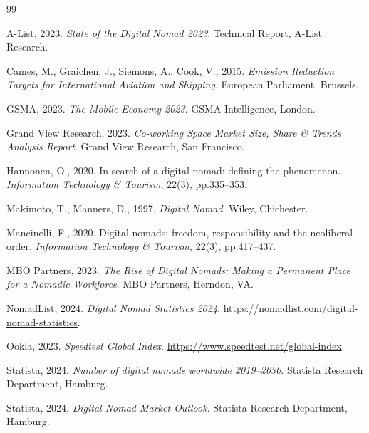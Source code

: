 \documentclass[12pt,a4paper]{article}
\begin{document}
\clearpage

\begin{thebibliography}{99}

A-List, 2023.
\newblock \emph{State of the Digital Nomad 2023}.
\newblock Technical Report, A-List Research.

Cames, M., Graichen, J., Siemons, A., Cook, V., 2015.
\newblock \emph{Emission Reduction Targets for International Aviation and
  Shipping}.
\newblock European Parliament, Brussels.

GSMA, 2023.
\newblock \emph{The Mobile Economy 2023}.
\newblock GSMA Intelligence, London.

Grand View Research, 2023.
\newblock \emph{Co-working Space Market Size, Share \& Trends Analysis Report}.
\newblock Grand View Research, San Francisco.

Hannonen, O., 2020.
\newblock In search of a digital nomad: defining the phenomenon.
\newblock \emph{Information Technology \& Tourism}, 22(3), pp.335--353.

Makimoto, T., Manners, D., 1997.
\newblock \emph{Digital Nomad}.
\newblock Wiley, Chichester.

Mancinelli, F., 2020.
\newblock Digital nomads: freedom, responsibility and the neoliberal order.
\newblock \emph{Information Technology \& Tourism}, 22(3), pp.417--437.

MBO Partners, 2023.
\newblock \emph{The Rise of Digital Nomads: Making a Permanent Place for a
  Nomadic Workforce}.
\newblock MBO Partners, Herndon, VA.

NomadList, 2024.
\newblock \emph{Digital Nomad Statistics 2024}.
\newblock \url{https://nomadlist.com/digital-nomad-statistics}.

Ookla, 2023.
\newblock \emph{Speedtest Global Index}.
\newblock \url{https://www.speedtest.net/global-index}.

Statista, 2024.
\newblock \emph{Number of digital nomads worldwide 2019--2030}.
\newblock Statista Research Department, Hamburg.

Statista, 2024.
\newblock \emph{Digital Nomad Market Outlook}.
\newblock Statista Research Department, Hamburg.

\end{thebibliography}
\end{document}
